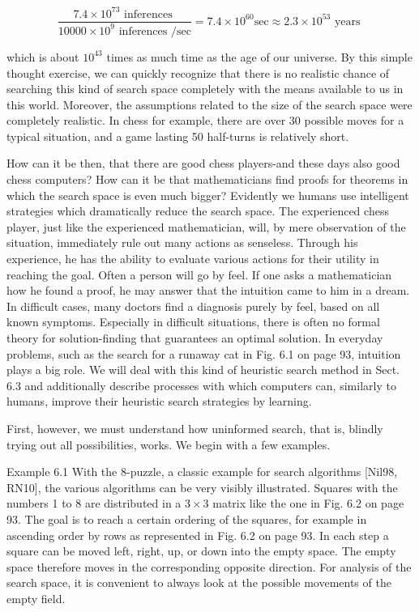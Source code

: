 \documentclass[10pt]{article}
\begin{document}
$$
\frac{7.4 \times 10^{73} \text { inferences }}{10000 \times 10^{9} \text { inferences } / \mathrm{sec}}=7.4 \times 10^{60} \mathrm{sec} \approx 2.3 \times 10^{53} \text { years }
$$

which is about $10^{43}$ times as much time as the age of our universe. By this simple thought exercise, we can quickly recognize that there is no realistic chance of searching this kind of search space completely with the means available to us in this world. Moreover, the assumptions related to the size of the search space were completely realistic. In chess for example, there are over 30 possible moves for a typical situation, and a game lasting 50 half-turns is relatively short.

How can it be then, that there are good chess players-and these days also good chess computers? How can it be that mathematicians find proofs for theorems in which the search space is even much bigger? Evidently we humans use intelligent strategies which dramatically reduce the search space. The experienced chess player, just like the experienced mathematician, will, by mere observation of the situation, immediately rule out many actions as senseless. Through his experience, he has the ability to evaluate various actions for their utility in reaching the goal. Often a person will go by feel. If one asks a mathematician how he found a proof, he may answer that the intuition came to him in a dream. In difficult cases, many doctors find a diagnosis purely by feel, based on all known symptoms. Especially in difficult situations, there is often no formal theory for solution-finding that guarantees an optimal solution. In everyday problems, such as the search for a runaway cat in Fig. 6.1 on page 93, intuition plays a big role. We will deal with this kind of heuristic search method in Sect. 6.3 and additionally describe processes with which computers can, similarly to humans, improve their heuristic search strategies by learning.

First, however, we must understand how uninformed search, that is, blindly trying out all possibilities, works. We begin with a few examples.

Example 6.1 With the 8-puzzle, a classic example for search algorithms [Nil98, RN10], the various algorithms can be very visibly illustrated. Squares with the numbers 1 to 8 are distributed in a $3 \times 3$ matrix like the one in Fig. 6.2 on page 93. The goal is to reach a certain ordering of the squares, for example in ascending order by rows as represented in Fig. 6.2 on page 93. In each step a square can be moved left, right, up, or down into the empty space. The empty space therefore moves in the corresponding opposite direction. For analysis of the search space, it is convenient to always look at the possible movements of the empty field.
\end{document}
